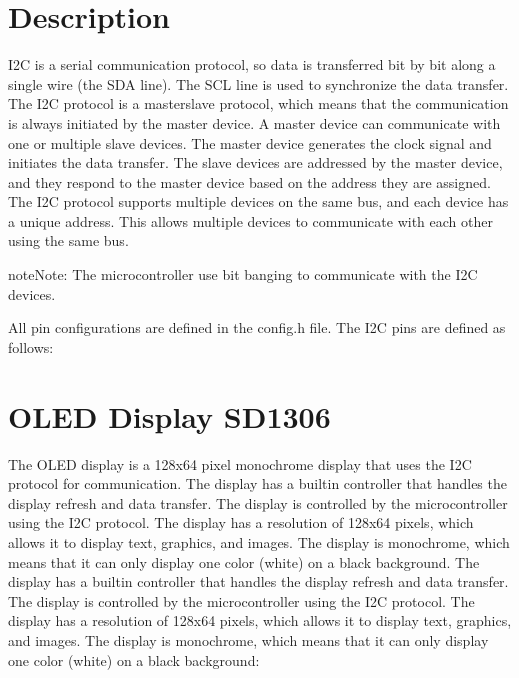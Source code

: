 \documentclass[letterpaper,10pt,english]{sphinxmanual}
\begin{document}
\section{Description}
\label{\detokenize{i2c:description}}
\sphinxAtStartPar
I2C is a serial communication protocol, so data is transferred bit by bit along a single wire (the SDA line). The SCL line is used to synchronize the data transfer. The I2C protocol is a master\sphinxhyphen{}slave protocol, which means that the communication is always initiated by the master device. A master device can communicate with one or multiple slave devices. The master device generates the clock signal and initiates the data transfer. The slave devices are addressed by the master device, and they respond to the master device based on the address they are assigned. The I2C protocol supports multiple devices on the same bus, and each device has a unique address. This allows multiple devices to communicate with each other using the same bus.

\begin{sphinxadmonition}{note}{Note:}
\sphinxAtStartPar
The microcontroller use bit banging to communicate with the I2C devices.
\end{sphinxadmonition}

\sphinxAtStartPar
All pin configurations are defined in the config.h file. The I2C pins are defined as follows:

\begin{sphinxVerbatim}[commandchars=\\\{\}]
\end{sphinxVerbatim}


\section{OLED Display SD1306}
\label{\detokenize{i2c:oled-display-sd1306}}
\sphinxAtStartPar
The OLED display is a 128x64 pixel monochrome display that uses the I2C protocol for communication. The display has a built\sphinxhyphen{}in controller that handles the display refresh and data transfer. The display is controlled by the microcontroller using the I2C protocol. The display has a resolution of 128x64 pixels, which allows it to display text, graphics, and images. The display is monochrome, which means that it can only display one color (white) on a black background. The display has a built\sphinxhyphen{}in controller that handles the display refresh and data transfer. The display is controlled by the microcontroller using the I2C protocol. The display has a resolution of 128x64 pixels, which allows it to display text, graphics, and images. The display is monochrome, which means that it can only display one color (white) on a black background:
\end{document}
